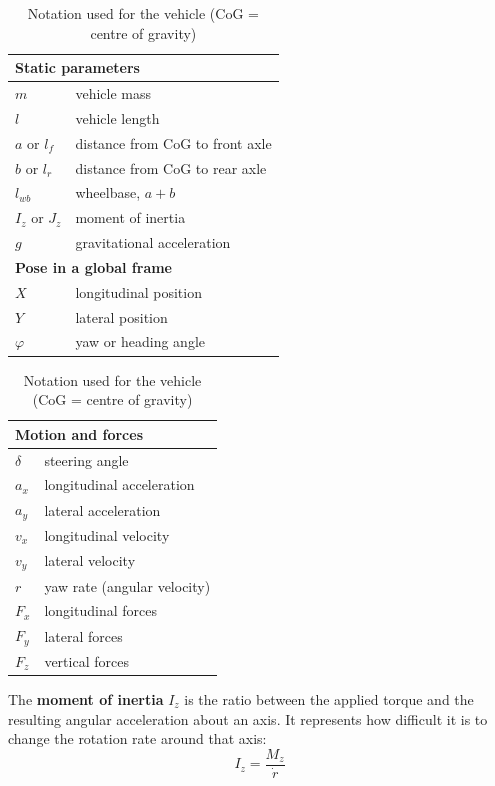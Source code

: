 \begin{table}[H]
    \centering
    \small
    \begin{tabular}[t]{ll}
        \hline
        \multicolumn{2}{l}{\textbf{Static parameters}}\\
        \hline
        $m$ & vehicle mass\\
        $l$ & vehicle length\\
        $a$ or $l_f$ & distance from CoG to front axle\\
        $b$ or $l_r$ & distance from CoG to rear axle\\
        $l_{wb}$ & wheelbase, $a + b$\\
        $I_z$ or $J_z$ & moment of inertia\\
        $g$ & gravitational acceleration\\
        \hline
        \multicolumn{2}{l}{\textbf{Pose in a global frame}}\\
        \hline
        $X$ & longitudinal position\\
        $Y$ & lateral position\\
        $\varphi$ & yaw or heading angle\\
        \hline
    \end{tabular}
    \hspace{0.6cm}
    \begin{tabular}[t]{ll}
        \hline
        \multicolumn{2}{l}{\textbf{Motion and forces}}\\
        \hline
        $\delta$ & steering angle\\
        $a_x$ & longitudinal acceleration\\
        $a_y$ & lateral acceleration\\
        $v_x$ & longitudinal velocity\\
        $v_y$ & lateral velocity\\
        $r$ & yaw rate (angular velocity)\\
        $F_x$ & longitudinal forces\\
        $F_y$ & lateral forces\\
        $F_z$ & vertical forces\\
        \hline
    \end{tabular}
    \caption{Notation used for the vehicle (CoG = centre of gravity)}
\end{table}

The \textbf{moment of inertia} $I_z$ is the ratio between the applied torque and the resulting angular acceleration about an axis. It represents how difficult it is to change the rotation rate around that axis:
\[
I_z = \frac{M_z}{\dot r}
\]

